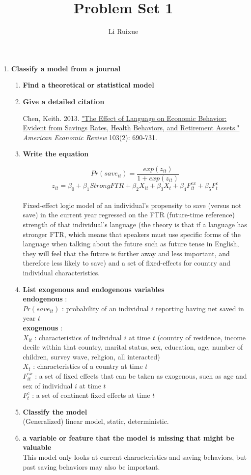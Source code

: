 \documentclass[11pt, oneside]{article}
\title{Problem Set 1}
\author{Li Ruixue}
\begin{document}
\maketitle

\begin{enumerate}
\item \textbf{Classify a model from a journal}

\begin{enumerate} [label=(\alph*)]
\item \textbf{Find a theoretical or statistical model}
\item \textbf{Give a detailed citation}  

Chen, Keith. 2013. \href{http://www.jstor.org/stable/23469680?seq=1#page_scan_tab_contents}{"The Effect of Language on Economic Behavior: Evident from Savings Rates, Health Behaviors, and Retirement Assets."}  \textit{American Economic Review} 103(2): 690-731. 
\item \textbf{Write the equation}

$$ Pr(save_{it}) = \frac{exp(z_{it})}{1+exp(z_{it})} $$
$$z_{it} = \beta _0 + \beta _1 StrongFTR + \beta _2 X_{it} + \beta _3 X_t + \beta _4 F^{ex}_{it} + \beta _5 F^c_t $$   \\
Fixed-effect logic model of an individual's propensity to save (versus not save) in the current year regressed on the FTR (future-time reference) strength of that individual's language (the theory is that if a language has stronger FTR, which means that speakers must use specific forms of the language when talking about the future such as future tense in English, they will feel that the future is further away and less important, and therefore less likely to save) and a set of fixed-effects for country and individual characteristics.
\item \textbf{List exogenous and endogenous variables}  \\
\textbf{endogenous} :\\ $Pr(save_{it})$ : probability of an individual $i$ reporting having net saved in year $t$    \\
\textbf{exogenous} :\\$X_{it}$ : characteristics of individual $i$ at time $t$ (country of residence, income decile within that country, marital status, sex, education, age, number of children, survey wave, religion, all interacted) \\  
$X_{t}$ : characteristics of a country at time $t$  \\
$F^{ex}_{it}$ : a set of fixed effects that can be taken as exogenous, such as age and sex of individual $i$ at time $t$  \\
$F^c_t$ : a set of continent fixed effects at time $t$  \\  
\item \textbf{Classify the model}\\
(Generalized) linear model, static, deterministic.
\item \textbf{a variable or feature that the model is missing that might be valuable}\\
This model only looks at current characteristics and saving behaviors, but past saving behaviors may also be important. 


\end{enumerate}
\end{enumerate}
\end{document}
